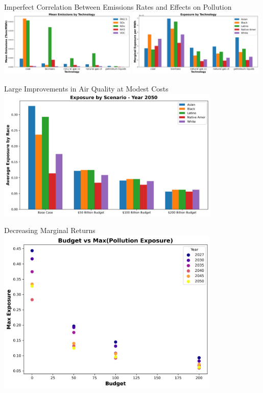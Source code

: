 \documentclass{beamer}
\begin{document}
\begin{frame}{Imperfect Correlation Between Emissions Rates and Effects on Pollution}
\includegraphics[width=0.49\textwidth]{Figures/EndogenousPaper/emissions_by_technology.png}
\includegraphics[width=0.49\textwidth]{Figures/EndogenousPaper/exposure_by_technology.png}
\end{frame}

\begin{frame}{Large Improvements in Air Quality at Modest Costs}
    \centering
    \includegraphics[width=0.8\textwidth]{Figures/EndogenousPaper/exposure_by_scenario_2050.png}
\end{frame}

\begin{frame}{Decreasing Marginal Returns}
    \centering
    \includegraphics[width=0.8\textwidth]{Figures/EndogenousPaper/exposure_cost_PPF.png}
\end{frame}
\end{document}
